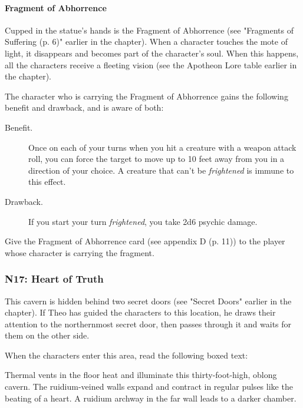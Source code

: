 \documentclass[letterpaper, 11pt, bg=full, twocolumn]{dndbook}
\begin{document}
\paragraph{Fragment of Abhorrence}

Cupped in the statue's hands is the Fragment of Abhorrence (see "Fragments of Suffering (p. 6)" earlier in the chapter). When a character touches the mote of light, it disappears and becomes part of the character's soul. When this happens, all the characters receive a fleeting vision (see the Apotheon Lore table earlier in the chapter).

The character who is carrying the Fragment of Abhorrence gains the following benefit and drawback, and is aware of both:

\begin{DndSidebar}{}
\begin{description}
\item[Benefit.] Once on each of your turns when you hit a creature with a weapon attack roll, you can force the target to move up to 10 feet away from you in a direction of your choice. A creature that can't be \textit{frightened} is immune to this effect.
\item[Drawback.] If you start your turn \textit{frightened}, you take 2d6 psychic damage.
\end{description}
\end{DndSidebar}

Give the Fragment of Abhorrence card (see appendix D (p. 11)) to the player whose character is carrying the fragment.

\subsubsection{N17: Heart of Truth}

This cavern is hidden behind two secret doors (see "Secret Doors" earlier in the chapter). If Theo has guided the characters to this location, he draws their attention to the northernmost secret door, then passes through it and waits for them on the other side.

When the characters enter this area, read the following boxed text:

\begin{DndReadAloud}
Thermal vents in the floor heat and illuminate this thirty-foot-high, oblong cavern. The ruidium-veined walls expand and contract in regular pulses like the beating of a heart. A ruidium archway in the far wall leads to a darker chamber.
\end{DndReadAloud}
\end{document}
